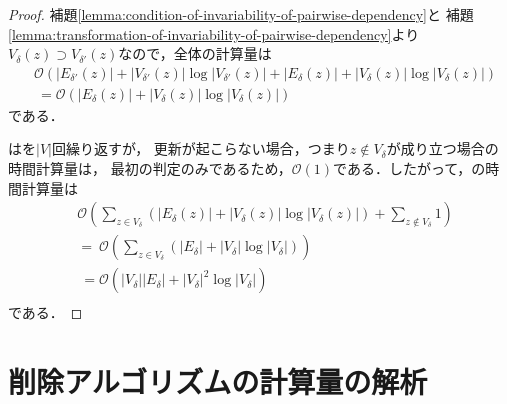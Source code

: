 \begin{proof}
  補題\ref{lemma:condition-of-invariability-of-pairwise-dependency}と
  補題\ref{lemma:transformation-of-invariability-of-pairwise-dependency}より
  $V_\delta(z)\supset V_{\delta'}(z)$なので，全体の計算量は
  \begin{equation*}
    \begin{aligned}
      &\mathcal{O}(
        \lvert E_{\delta'}(z)\rvert+\lvert V_{\delta'}(z)\rvert\log\lvert V_{\delta'}(z)\rvert
        +\lvert E_\delta(z)\rvert+\lvert V_\delta(z)\rvert\log\lvert V_\delta(z)\rvert
      ) \nonumber\\
      &\:=\mathcal{O}(\lvert E_\delta(z)\rvert+\lvert V_\delta(z)\rvert\log\lvert V_\delta(z)\rvert)
    \end{aligned}
  \end{equation*}
  である．

  はを$\lvert V\rvert$回繰り返すが，
  更新が起こらない場合，つまり$z\notin V_\delta$が成り立つ場合の時間計算量は，
  最初の判定のみであるため，$\mathcal{O}(1)$である．したがって，の時間計算量は
  \begin{equation*}
    \begin{aligned}
      &\mathcal{O}(
      \sum_{z\in V_\delta}(\lvert E_\delta(z)\rvert+\lvert V_\delta(z)\rvert\log\lvert V_\delta(z)\rvert)
      +\sum_{z\notin V_\delta}1) \nonumber\\
      &=\:\mathcal{O}(\sum_{z\in V_\delta}(\lvert E_\delta\rvert
      +\lvert V_\delta\rvert\log\lvert V_\delta\rvert))\nonumber\\
      &\:=\mathcal{O}(\lvert V_\delta\rvert\lvert E_\delta\rvert
      +\lvert V_\delta\rvert^2\log\lvert V_\delta\rvert) \nonumber\\
    \end{aligned}
  \end{equation*}
  である．
\end{proof}

\section{削除アルゴリズムの計算量の解析}
\label{subsect:computational-complexity-of-decremental-algorithm}

